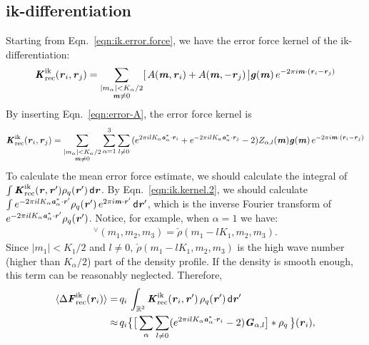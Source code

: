 \documentclass[aps,pre,preprint,unsortedaddress]{revtex4}
\renewcommand{\v}[1]{\textbf{\textit{#1}}}
\renewcommand{\d}[1]{\textsf{#1}}
\begin{document}
\subsection{ik-differentiation}
Starting from Eqn.~\eqref{eqn:ik.error.force}, we have the error force kernel
of the ik-differentiation:
\begin{align}
  \v K^{\textrm{ik}}_{\textrm{rec}}(\v r_i, \v r_j)
  =
  \sum_{
    \begin{subarray}{c}
      \vert m_{\alpha}\vert < K_\alpha/2\\
      \v m\neq 0
    \end{subarray}}
  [\,A(\v m, \v r_i) + A(\v m,-\v r_j)\,]
  \v g(\v m)\,e^{-2\pi i\v m\cdot(\v r_i-\v r_j)}
\end{align}
By inserting Eqn.~\eqref{eqn:error-A}, the error force kernel is
\begin{align}
  \label{eqn:ik.kernel.2}
  \v K^{\textrm{ik}}_{\textrm{rec}}(\v r_i, \v r_j)
  =
  \sum_{
    \begin{subarray}{c}
      \vert m_{\alpha}\vert < K_\alpha/2\\
      \v m\neq 0
    \end{subarray}}
  \sum_{\alpha=1}^3\sum_{l\neq 0}
  \,(
  e^{2\pi i l K_\alpha\v a^\ast_\alpha\cdot \v r_i} +
  e^{-2\pi i l K_\alpha\v a^\ast_\alpha\cdot \v r_j}
  - 2
  )
  Z_{\alpha,l}(\v m)
  \v g(\v m)\,e^{-2\pi i\v m\cdot(\v r_i-\v r_j)}
\end{align}
To calculate the mean error force estimate, we should
calculate the integral of
$\int \v K^{\textrm{ik}}_{\textrm{rec}}(\v r, \v r')\rho_q(\v r')\,\d d\v r$.
By Eqn.~\eqref{eqn:ik.kernel.2}, we should calculate
$  \int e^{-2\pi i l K_\alpha\v a^\ast_\alpha\cdot \v r'}\rho_q(\v r')
\,e^{2\pi i\v m\cdot\v r'}\,\d d\v r'$, which is the inverse Fourier transform
of $e^{-2\pi i l K_\alpha\v a^\ast_\alpha\cdot \v r'}\rho_q(\v r')$. Notice,
for example, when $\alpha=1$ we have:
\begin{align}
  [\,\rho_q(\v r')\,e^{-2\pi i l K_1\v a^\ast_1\cdot \v r'}\,] ^\vee
  (m_1, m_2, m_3)
  = \check\rho(m_1-lK_1, m_2, m_3).
\end{align}
Since $\vert m_1\vert < K_1/2$ and $l\neq 0$,
$\check\rho(m_1-lK_1, m_2, m_3)$ is
the high wave number (higher than $K_\alpha / 2$) part of the density profile.
If the density is smooth enough, this term can be reasonably neglected.
Therefore,
\begin{align}\nonumber
  \langle\Delta\v F^{\textrm{ik}}_{\textrm{rec}}(\v r_i)\rangle
  =\,&
  q_i\, \int_{\mathbb R^3}
  \v K^{\textrm{ik}}_{\textrm{rec}} (\v r_i,\v r')\,\rho_q(\v r')\,\d d\v r'\\
  \approx\,&
  q_i
  \big\{
  \big[
  \sum_{\alpha}\sum_{l\neq 0}
  (e^{2\pi i l K_\alpha\v a^\ast_\alpha\cdot \v r_i}   - 2 )
  \v G_{\alpha,l}
  \big]
  \ast\rho_q\,
  \big\} (\v r_i),
\end{align}
\end{document}

